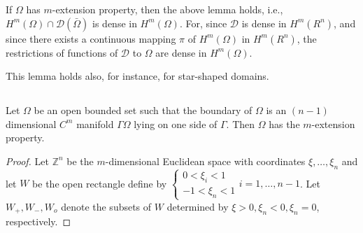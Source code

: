 \begin{remark}\label{lec3:sec2:subsec2:rem1}%
  If $\Omega$ has $m$-extension property, then the above lemma holds,
  i.e., $H^m(\Omega) \cap \mathscr{D} (\bar{\Omega})$ is dense in
  $H^m(\Omega)$. For, since $\mathscr{D}$ is dense in $H^m(R^n)$, and
  since there exists a continuous mapping $\pi$ of $H^m(\Omega)$ in $H^m
  (R^n)$, the restrictions of functions of $\mathscr{D}$ to $\Omega$ are
  dense in $H^m(\Omega)$. 
\end{remark}

\begin{remark}\label{lec3:sec2:subsec2:rem2}%
  This lemma holds also, for instance, for star-shaped domains.
\end{remark}

\subsection{} \label{lec3:sec2:subsec3} %

\begin{theorem}\label{lec3:sec2:subsec3:thm2.4}%
  Let $\Omega$ be an open bounded set such that the boundary of $\Omega$
  is an $(n-1)$ dimensional $C^m$ manifold $\Gamma \Omega$ lying on one
  side of $\Gamma$. Then $\Omega$ has the $m$-extension property. 
\end{theorem}

\begin{proof}
Let $\mathbb{Z}^n$ be the $m$-dimensional Euclidean space with
coordinates $\xi, \ldots , \xi_n$ and let $W$ be the open rectangle
define by 
$\begin{cases} 
0 < \xi_i <1 \\ 
-1 < \xi_n <1
\end{cases}
i=1, \ldots , n-1$.
Let $W_+,W_-,W_o$  denote the subsets of $W$ determined by $\xi >0,
\xi _n <0, \xi_n=0$, respectively. 
\end{proof}

